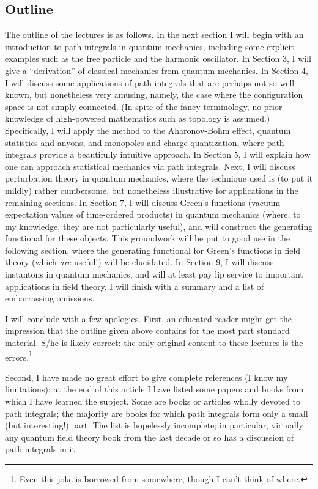\documentclass[12pt]{article}
\begin{document}
\subsection{Outline}
The outline of the lectures is as follows. In the next section I will
begin with an introduction to path integrals in quantum mechanics,
including some explicit examples such as the free particle and the
harmonic oscillator. In Section 3, I will give a ``derivation'' of
classical mechanics from quantum mechanics. In Section 4, I will
discuss some applications of path integrals that are perhaps not so
well-known, but nonetheless very amusing, namely, the case where the
configuration space is not simply connected. (In spite of the fancy
terminology, no prior knowledge of high-powered mathematics such as
topology is assumed.) Specifically, I will apply the method to the
Aharonov-Bohm effect, quantum statistics and anyons, and monopoles and
charge quantization, where path integrals provide a beautifully
intuitive approach. In Section 5, I will explain how one can approach
statistical mechanics via path integrals. Next, I will discuss
perturbation theory in quantum mechanics, where the technique used is
(to put it mildly) rather cumbersome, but nonetheless
illustrative for applications in the remaining
sections. In Section 7, I will discuss Green's functions (vacuum
expectation values of time-ordered products) in quantum mechanics
(where, to my knowledge, they are not particularly useful), and will
construct the generating functional for these objects. This groundwork
will be put to good use in the following section, where the generating
functional for Green's functions in field theory (which {\em are}
useful!) will be elucidated. In Section 9, I will discuss instantons
in quantum mechanics, and will at least pay lip service to important
applications in field theory. I will finish with a summary and a list of
embarrassing omissions.

I will conclude with a few apologies.
First, an educated reader might get the impression that the outline
given above contains for the most part standard material. S/he is
likely correct: the only original content to these lectures is the
errors.\footnote{Even this joke is borrowed from somewhere, though
I can't think of where.}

Second, I have made no great
effort to give complete references (I know my limitations); 
at the end of this article I have listed some papers and
books from which I have learned the subject. Some are books or
articles wholly devoted to path integrals; the majority are books for
which path integrals form only a small (but interesting!)
part. The list is
hopelessly incomplete; in particular, virtually any quantum field
theory book from the last decade or so has a discussion of path
integrals in it.
\end{document}
